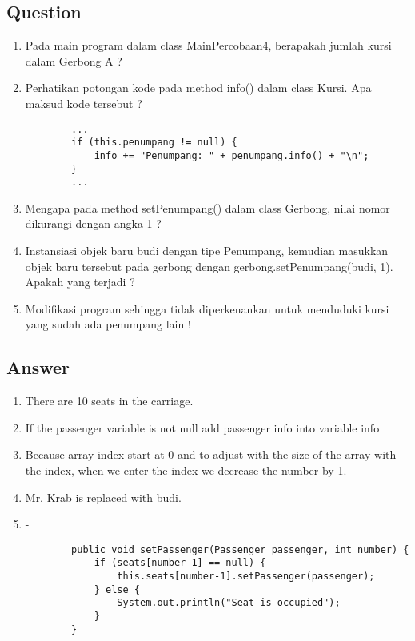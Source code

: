 \documentclass[12pt,titlepage]{article}
\begin{document}
\newpage

\subsection{Question}
\begin{enumerate}
    \item Pada main program dalam class MainPercobaan4, berapakah jumlah kursi dalam Gerbong A ?
    \item Perhatikan potongan kode pada method info() dalam class Kursi. Apa maksud kode tersebut ?
    \begin{verbatim}
        ...
        if (this.penumpang != null) {
            info += "Penumpang: " + penumpang.info() + "\n";
        }
        ...
    \end{verbatim}
    \item Mengapa pada method setPenumpang() dalam class Gerbong, nilai nomor dikurangi dengan angka 1 ?
    \item Instansiasi objek baru budi dengan tipe Penumpang, kemudian masukkan objek baru tersebut pada gerbong dengan gerbong.setPenumpang(budi, 1). Apakah yang terjadi ?
    \item Modifikasi program sehingga tidak diperkenankan untuk menduduki kursi yang sudah ada penumpang lain !
\end{enumerate}

\subsection{Answer}
\begin{enumerate}
    \item There are 10 seats in the carriage.
    \item If the passenger variable is not null add passenger info into variable info
    \item Because array index start at 0 and to adjust with the size of the array with the index, when we enter the index we decrease the number by 1.
    \item Mr. Krab is replaced with budi.
    \item -
    \begin{verbatim}
        public void setPassenger(Passenger passenger, int number) {
            if (seats[number-1] == null) {
                this.seats[number-1].setPassenger(passenger);
            } else {
                System.out.println("Seat is occupied");
            }
        }
    \end{verbatim}
\end{enumerate}
\end{document}
